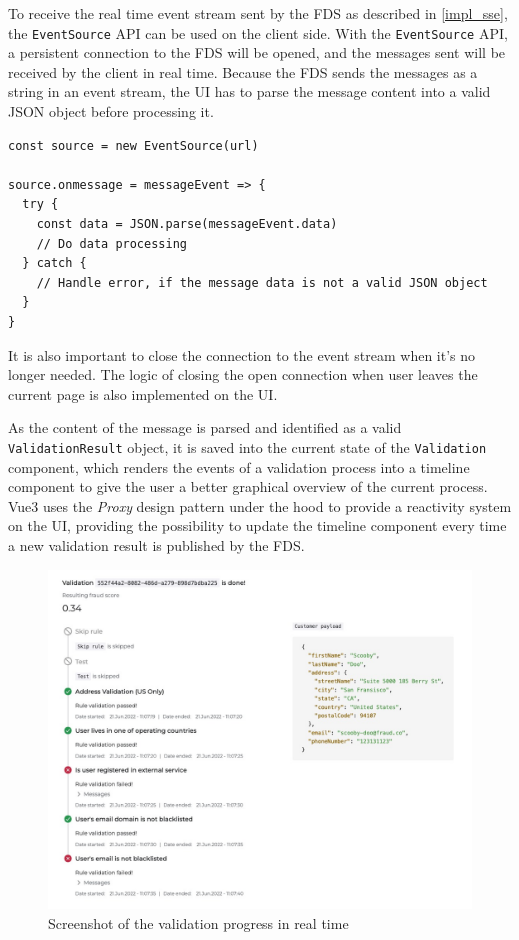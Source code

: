     To receive the real time event stream sent by the FDS as described in \autoref{impl_sse}, the \verb;EventSource; API can be used on the client side. With the \verb;EventSource; API, a persistent connection to the FDS will be opened, and the messages sent will be received by the client in real time. Because the FDS sends the messages as a string in an event stream, the UI has to parse the message content into a valid JSON object before processing it. 

    \begin{lstlisting}[style=es6, caption={Using the EventSource API in the browser (TypeScript)}]
const source = new EventSource(url)

source.onmessage = messageEvent => {
  try {
    const data = JSON.parse(messageEvent.data)
    // Do data processing
  } catch {
    // Handle error, if the message data is not a valid JSON object
  }
}
    \end{lstlisting}

    It is also important to close the connection to the event stream when it's no longer needed. The logic of closing the open connection when user leaves the current page is also implemented on the UI. 

    As the content of the message is parsed and identified as a valid \verb;ValidationResult; object, it is saved into the current state of the \verb;Validation; component, which renders the events of a validation process into a timeline component to give the user a better graphical overview of the current process. Vue3 uses the \emph{Proxy}\autocite[pp. 207-217]{gamma-1995} design pattern under the hood to provide a reactivity system on the UI, providing the possibility to update the timeline component every time a new validation result is published by the FDS. 

    \begin{figure}[!ht]
      \includegraphics[width=\textwidth]{images/ss_validation_progress.jpeg}
      \caption{Screenshot of the validation progress in real time}
    \end{figure}

